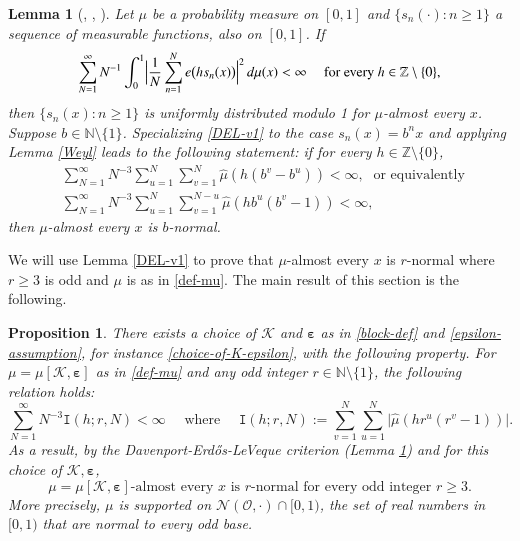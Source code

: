 \documentclass[12pt, twoside]{article}
\newtheorem{lemma}[theorem]{Lemma}
\newtheorem{proposition}[theorem]{Proposition}
\theoremstyle{definition}
\numberwithin{equation}{section}
\begin{document}
\begin{lemma}[\cite{del63}, {\cite[Theorem 1.3]{Gao-Ma-Song-Zhang}}, {\cite[Theorem DEL]{PVZZ}}] \label{DEL-lemma}
Let $\mu$ be a probability measure on $[0,1]$ and $\{s_n(\cdot) : n \geq 1\}$ a sequence of measurable functions, also on $[0,1]$. If 
\begin{equation} \label{DEL-v1} 
\sum_{N=1}^{\infty} N^{-1} \int_{0}^{1} \Bigl| \frac{1}{N} \sum_{n=1}^{N} e \bigl(h s_n(x) \bigr)\Bigr|^2 \, d\mu(x) < \infty \quad \text{ for every } h \in \mathbb Z \setminus \{0\},  
\end{equation}  
then $\{s_n(x) : n \geq 1\}$ is uniformly distributed modulo 1 for $\mu$-almost every $x$. 
\vskip0.1in 
\noindent Suppose $b \in \mathbb N \setminus \{1\}$. Specializing \eqref{DEL-v1} to the case $s_n(x) = b^n x$ and applying Lemma \ref{Weyl} leads to the following statement: if  for every $h \in \mathbb Z \setminus \{0\}$, 
\begin{align} 
&\sum_{N=1}^{\infty} N^{-3} \sum_{u = 1}^{N} \sum_{v = 1}^{N} \widehat{\mu}(h(b^v-b^u)) < \infty, \; \text{ or equivalently } \nonumber \\ 
&\sum_{N=1}^{\infty} N^{-3} \sum_{u = 1}^{N} \sum_{v = 1}^{N-u} \widehat{\mu}(hb^u (b^v-1)) < \infty, 
\end{align}  
then $\mu$-almost every $x$ is $b$-normal.  
\end{lemma} 
\noindent We will use Lemma \ref{DEL-v1} to prove that $\mu$-almost every $x$ is $r$-normal where $r \geq 3$ is odd and $\mu$ is as in \eqref{def-mu}.   
The main result of this section is the following. 
\begin{proposition} \label{mu-odd-normal}
There exists a choice of $\mathcal K$ and $\pmb{\varepsilon}$ as in \eqref{block-def} and \eqref{epsilon-assumption}, for instance \eqref{choice-of-K-epsilon}, with the following property. For $\mu = \mu[\mathcal K, \pmb{\varepsilon}]$ as in \eqref{def-mu} and any odd integer $r \in \mathbb N \setminus \{1\}$, the following relation holds:  
\begin{equation} \label{I-est}
\sum_{N=1}^{\infty} N^{-3} \mathtt I(h; r, N) < \infty \quad \text{  where } \quad 
\mathtt I(h;r, N) := \sum_{v = 1}^{N} \sum_{u = 1}^{N} \bigl| \widehat{\mu}(hr^u(r^v-1)) \bigr|. 
\end{equation} 
As a result, by the Davenport-Erd\H{o}s-LeVeque criterion (Lemma \ref{DEL-lemma}) and for this choice of $\mathcal K, \pmb{\varepsilon}$,  
\[\text{$\mu = \mu[\mathcal K, \pmb{\varepsilon}]$-almost every $x$ is $r$-normal for every odd integer $r \geq 3$.} \] More precisely, $\mu$ is supported on $\mathscr N(\mathcal O, \cdot) \cap [0,1)$, the set of real numbers in $[0, 1)$ that are normal to every odd base. 
\end{proposition}
\end{document}
